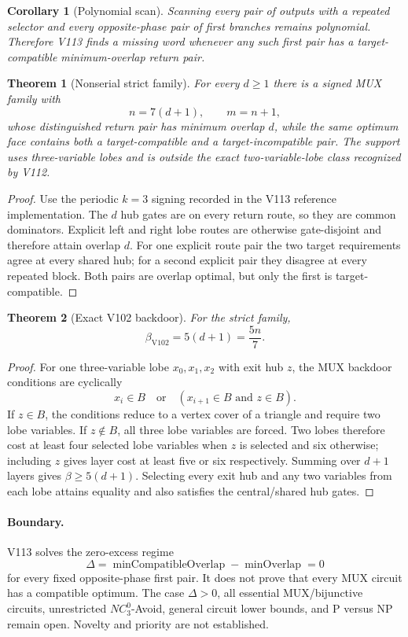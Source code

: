 \documentclass[11pt]{article}
\newtheorem{theorem}{Theorem}
\newtheorem{corollary}{Corollary}
\begin{document}
\begin{corollary}[Polynomial scan]
Scanning every pair of outputs with a repeated selector and every opposite-phase pair of
first branches remains polynomial.  Therefore V113 finds a missing word whenever any
such first pair has a target-compatible minimum-overlap return pair.
\end{corollary}

\begin{theorem}[Nonserial strict family]
For every $d\ge1$ there is a signed MUX family with
\[
 n=7(d+1),\qquad m=n+1,
\]
whose distinguished return pair has minimum overlap $d$, while the same optimum face
contains both a target-compatible and a target-incompatible pair.  The support uses
three-variable lobes and is outside the exact two-variable-lobe class recognized by
V112.
\end{theorem}

\begin{proof}
Use the periodic $k=3$ signing recorded in the V113 reference implementation.  The
$d$ hub gates are on every return route, so they are common dominators.  Explicit left
and right lobe routes are otherwise gate-disjoint and therefore attain overlap $d$.
For one explicit route pair the two target requirements agree at every shared hub; for
a second explicit pair they disagree at every repeated block.  Both pairs are overlap
optimal, but only the first is target-compatible.
\end{proof}

\begin{theorem}[Exact V102 backdoor]
For the strict family,
\[
 \beta_{\mathrm{V102}}=5(d+1)=\frac{5n}{7}.
\]
\end{theorem}

\begin{proof}
For one three-variable lobe $x_0,x_1,x_2$ with exit hub $z$, the MUX backdoor conditions
are cyclically
\[
 x_i\in B\quad\text{or}\quad (x_{i+1}\in B\text{ and }z\in B).
\]
If $z\in B$, the conditions reduce to a vertex cover of a triangle and require two lobe
variables.  If $z\notin B$, all three lobe variables are forced.  Two lobes therefore
cost at least four selected lobe variables when $z$ is selected and six otherwise;
including $z$ gives layer cost at least five or six respectively.  Summing over $d+1$
layers gives $\beta\ge5(d+1)$.  Selecting every exit hub and any two variables from each
lobe attains equality and also satisfies the central/shared hub gates.
\end{proof}

\paragraph{Boundary.}
V113 solves the zero-excess regime
\[
 \Delta=\operatorname{minCompatibleOverlap}-\operatorname{minOverlap}=0
\]
for every fixed opposite-phase first pair.  It does not prove that every MUX circuit has
a compatible optimum.  The case $\Delta>0$, all essential MUX/bijunctive circuits,
unrestricted $NC^0_3$-Avoid, general circuit lower bounds, and P versus NP remain open.
Novelty and priority are not established.
\end{document}
